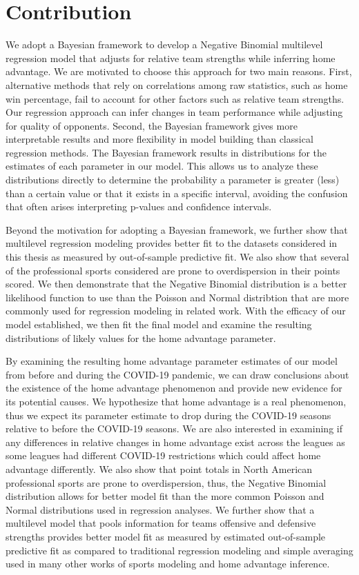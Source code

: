 \section{Contribution}

We adopt a Bayesian framework to develop a Negative Binomial multilevel regression model that adjusts for relative team strengths while inferring home advantage. We are motivated to choose this approach for two main reasons. First, alternative methods that rely on correlations among raw statistics, such as home win percentage, fail to account for other factors such as relative team strengths. Our regression approach can infer changes in team performance while adjusting for quality of opponents. Second, the Bayesian framework gives more interpretable results and more flexibility in model building than classical regression methods. The Bayesian framework results in distributions for the estimates of each parameter in our model. This allows us to analyze these distributions directly to determine the probability a parameter is greater (less) than a certain value or that it exists in a specific interval, avoiding the confusion that often arises interpreting p-values and confidence intervals.

Beyond the motivation for adopting a Bayesian framework, we further show that multilevel regression modeling provides better fit to the datasets considered in this thesis as measured by out-of-sample predictive fit. We also show that several of the professional sports considered are prone to overdispersion in their points scored. We then demonstrate that the Negative Binomial distribution is a better likelihood function to use than the Poisson and Normal distribtion that are more commonly used for regression modeling in related work. With the efficacy of our model established, we then fit the final model and examine the resulting distributions of likely values for the home advantage parameter.

By examining the resulting home advantage parameter estimates of our model from before and during the COVID-19 pandemic, we can draw conclusions about the existence of the home advantage phenomenon and provide new evidence for its potential causes. We hypothesize that home advantage is a real phenomenon, thus we expect its parameter estimate to drop during the COVID-19 seasons relative to before the COVID-19 seasons. We are also interested in examining if any differences in relative changes in home advantage exist across the leagues as some leagues had different COVID-19 restrictions which could affect home advantage differently. We also show that point totals in North American professional sports are prone to overdispersion, thus, the Negative Binomial distribution allows for better model fit than the more common Poisson and Normal distributions used in regression analyses. We further show that a multilevel model that pools information for teams offensive and defensive strengths provides better model fit as measured by estimated out-of-sample predictive fit as compared to traditional regression modeling and simple averaging used in many other works of sports modeling and home advantage inference.

